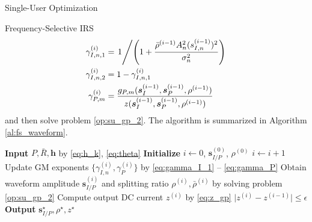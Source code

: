 \documentclass{IEEEtran}
\begin{document}
\begin{section}{Single-User Optimization}
\begin{subsection}{Frequency-Selective IRS}
		\begin{align}
			\gamma_{I,n,1}^{(i)} & = \left. 1 \middle/ \left(1+\frac{\bar{\rho}^{(i-1)}{A_n^2}(s_{I,n}^{(i-1)})^2}{\sigma_n^2}\right) \right.\label{eq:gamma_I_1}\\
			\gamma_{I,n,2}^{(i)} & = 1 - \gamma_{I,n,1}^{(i)}\label{eq:gamma_I_2}\\
			\gamma_{P,m}^{(i)} & =\frac{g_{P,m}(\boldsymbol{s}_I^{(i-1)},\boldsymbol{s}_P^{(i-1)},\rho^{(i-1)})}{z(\boldsymbol{s}_I^{(i-1)},\boldsymbol{s}_P^{(i-1)},\rho^{(i-1)})}\label{eq:gamma_P}
		\end{align}
		and then solve problem \ref{op:su_gp_2}. The algorithm is summarized in Algorithm \ref{al:fs_waveform}.
		\begin{algorithm}
			\caption{FS-IRS: Waveform Amplitude Optimization}
			\label{al:fs_waveform}
			\begin{algorithmic}[1]
				\State \textbf{Input} $P, \bar{R}, \boldsymbol{h}$ by \ref{eq:h_k}, \ref{eq:theta}
				\State \textbf{Initialize} $i \leftarrow 0$, $\boldsymbol{s}_{I/P}^{(0)}$, $\rho^{(0)}$
				\Repeat
				\State $i \leftarrow i + 1$
				\State Update GM exponents $\{\gamma_{I,n}^{(i)},\gamma_{P}^{(i)}\}$ by \ref{eq:gamma_I_1} -- \ref{eq:gamma_P}
				\State Obtain waveform amplitude $\boldsymbol{s}_{I/P}^{(i)}$ and splitting ratio $\rho^{(i)}, \bar{\rho}^{(i)}$ by solving problem \ref{op:su_gp_2}
				\State Compute output DC current $z^{(i)}$ by \ref{eq:z_gp}
				\Until $\lvert z^{(i)} - z^{(i-1)} \rvert \le \epsilon$
				\State \textbf{Output} $\boldsymbol{s}_{I/P}^{\star}, \rho^{\star}, z^{\star}$
			\end{algorithmic}
		\end{algorithm}
	\end{subsection}


\end{section}
\end{document}
